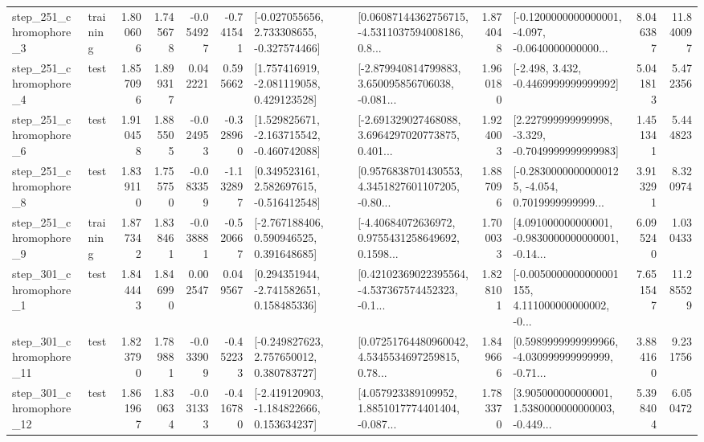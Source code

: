 \begin{tabular}{llrrrrllrlrr}
   step\_251\_chromophore\_3 &  training &      1.800606 &    1.745678 &     -0.054927 & -0.741541 &   [-0.027055656, 2.733308655, -0.327574466] &  [0.06087144362756715, -4.5311037594008186, 0.8... &       1.874048 &  [-0.1200000000000001, -4.097, -0.0640000000000... &            8.046387 &         11.840097 \\
   step\_251\_chromophore\_4 &      test &      1.857096 &    1.899317 &      0.042221 &  0.595662 &    [1.757416919, -2.081119058, 0.429123528] &  [-2.879940814799883, 3.650095856706038, -0.081... &       1.960180 &               [-2.498, 3.432, -0.4469999999999992] &            5.041813 &          5.472356 \\
   step\_251\_chromophore\_6 &      test &      1.910458 &    1.885505 &     -0.024953 & -0.328960 &   [1.529825671, -2.163715542, -0.460742088] &  [-2.691329027468088, 3.6964297020773875, 0.401... &       1.924003 &   [2.227999999999998, -3.329, -0.7049999999999983] &            1.451341 &          5.444823 \\
   step\_251\_chromophore\_8 &      test &      1.839110 &    1.755750 &     -0.083359 & -1.132897 &    [0.349523161, 2.582697615, -0.516412548] &  [0.9576838701430553, 4.3451827601107205, -0.80... &       1.887096 &  [-0.28300000000000125, -4.054, 0.7019999999999... &            3.913291 &          8.320974 \\
   step\_251\_chromophore\_9 &  training &      1.877342 &    1.838461 &     -0.038881 & -0.520667 &    [-2.767188406, 0.590946525, 0.391648685] &  [-4.40684072636972, 0.9755431258649692, 0.1598... &       1.700033 &  [4.091000000000001, -0.9830000000000001, -0.14... &            6.095240 &          1.030433 \\
   step\_301\_chromophore\_1 &      test &      1.844443 &    1.846990 &      0.002547 &  0.049567 &    [0.294351944, -2.741582651, 0.158485336] &  [0.42102369022395564, -4.537367574452323, -0.1... &       1.828101 &  [-0.0050000000000001155, 4.111000000000002, -0... &            7.651547 &         11.285529 \\
  step\_301\_chromophore\_11 &      test &      1.823790 &    1.789881 &     -0.033909 & -0.452233 &    [-0.249827623, 2.757650012, 0.380783727] &  [0.07251764480960042, 4.5345534697259815, 0.78... &       1.849666 &  [0.5989999999999966, -4.030999999999999, -0.71... &            3.884160 &          9.231756 \\
  step\_301\_chromophore\_12 &      test &      1.861967 &    1.830634 &     -0.031333 & -0.416780 &   [-2.419120903, -1.184822666, 0.153634237] &  [4.057923389109952, 1.8851017774401404, -0.087... &       1.783370 &  [3.905000000000001, 1.5380000000000003, -0.449... &            5.398404 &          6.050472 \\

\end{tabular}
